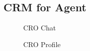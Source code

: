 \subsection{CRM for Agent}
\begin{figure}[H]
	\begin{center}
		\caption{CRO Chat}
		\label{fig:crm_agent}
	\end{center}
\end{figure}
\begin{figure}[H]
	\begin{center}
		\caption{CRO Profile}
	\end{center}
\end{figure}
\newpage
